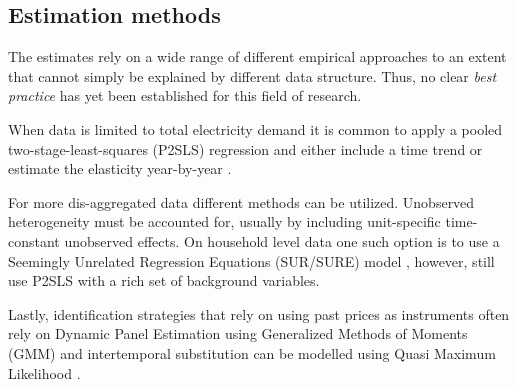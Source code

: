 \subsection{Estimation methods}
\label{subsec:b_estimation}
The estimates rely on a wide range of different empirical approaches to an extent that cannot simply be explained by different data structure. Thus, no clear \textit{best practice} has yet been established for this field of research.
\bigskip\par
When data is limited to total electricity demand it is common to apply a pooled two-stage-least-squares (P2SLS) regression and either include a time trend \citep{lijesen2007real} or estimate the elasticity year-by-year \citep{bonte2015price}.
\par
For more dis-aggregated data different methods can be utilized. Unobserved heterogeneity must be accounted for, usually by including unit-specific time-constant unobserved effects. On household level data one such option is to use a Seemingly Unrelated Regression Equations (SUR/SURE) model \citep{vesterberg2014residential}, however, \citet{alberini2019response} still use P2SLS with a rich set of background variables.
\par
Lastly, identification strategies that rely on using past prices as instruments often rely on Dynamic Panel Estimation using Generalized Methods of Moments (GMM) \citep{genc2016measuring} and intertemporal substitution can be modelled using Quasi Maximum Likelihood \citep{wolak2001impact}.
